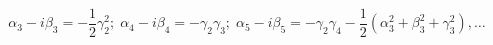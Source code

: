 \begin{equation}
\label{isopert}
\alpha_3-i\beta_3=-\frac{1}{2}\gamma_2^2;\;\alpha_4-i\beta_4=-\gamma_2\gamma_3;\;\alpha_5-i\beta_5=-\gamma_2\gamma_4-\frac{1}{2}(\alpha_3^2+\beta_3^2+\gamma_3^2),\dots
\end{equation}

